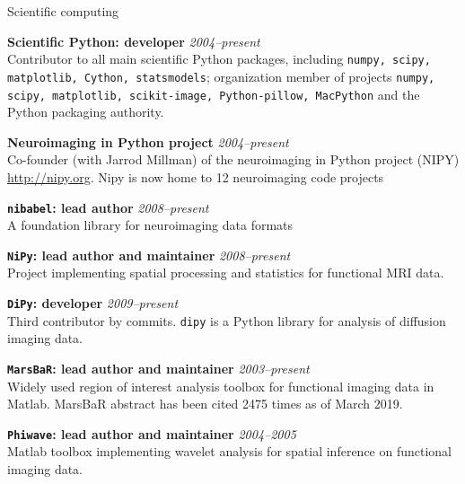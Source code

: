 \documentclass{cv}
\newcommand{\PlaceDateNote}[3]{{\bf #1} \hfill {\em #2} \\#3}
\newcommand{\Pkg}[1]{{\tt #1}}
\begin{document}
\begin{cvSection}{Scientific computing}

\PlaceDateNote{Scientific Python: developer}{2004--present}
{Contributor to all main scientific Python packages, including
    \Pkg{numpy, scipy, matplotlib, Cython, statsmodels}; organization member
    of projects \Pkg{numpy, scipy, matplotlib, scikit-image, Python-pillow,
MacPython} and the Python packaging authority.}

\PlaceDateNote{Neuroimaging in Python project}{2004--present}
{Co-founder (with Jarrod Millman) of the neuroimaging in Python project (NIPY)
    \url{http://nipy.org}.  Nipy is now home to 12 neuroimaging
    code projects}

\PlaceDateNote{\Pkg{nibabel}: lead author}{2008--present}
    {A foundation library for neuroimaging data formats}

\PlaceDateNote{\Pkg{NiPy}: lead author and maintainer}{2008--present}
    {Project implementing spatial processing and statistics for functional MRI
    data.}

\PlaceDateNote{\Pkg{DiPy}: developer}{2009--present}
    {Third contributor by commits.  \Pkg{dipy} is a Python library for
    analysis of diffusion imaging data}.

\PlaceDateNote{\Pkg{MarsBaR}: lead author and maintainer}{2003--present}
{Widely used region of interest analysis toolbox for functional imaging data
    in Matlab.  MarsBaR abstract has been cited 2475 times as of March 2019.}

    \PlaceDateNote{\Pkg{Phiwave}: lead author and maintainer}{2004--2005}
{Matlab toolbox implementing wavelet analysis for spatial inference on
    functional imaging data.}

\end{cvSection}
\end{document}
